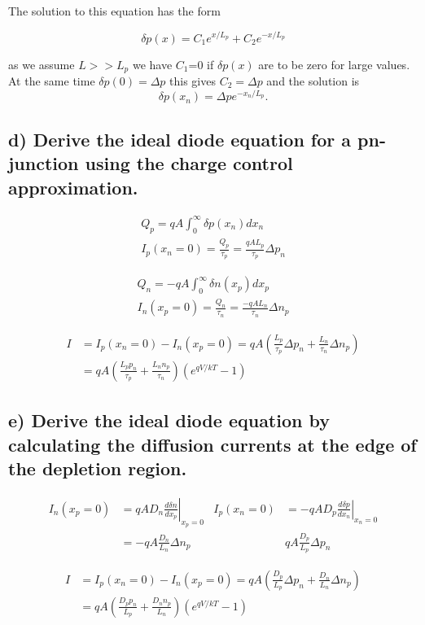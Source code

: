 The solution to this equation has the form

$$
\delta p(x)=C_1 e^{x / L_p}+C_2 e^{-x / L_p}
$$

as we assume $L>>L_p$ we have $C_1$=0 if $\delta p(x)$ are to be zero for large values. At the same time $\delta p(0)=\Delta p$ this gives $C_2=\Delta p$ and the solution is 
$$ \delta p\left(x_n\right)=\Delta p e^{-x_n / L_p} . $$

\subsection*{d) Derive the ideal diode equation for a pn-junction using the charge control approximation.}
$$
\begin{gathered}
Q_p=q A \int_0^{\infty} \delta p\left(x_n\right) d x_n \\
I_p\left(x_n=0\right)=\frac{Q_p}{\tau_p}=\frac{q A L_p}{\tau_p} \Delta p_n
\end{gathered}
$$

$$
\begin{gathered}
Q_n=-q A \int_0^{\infty} \delta n\left(x_p\right) d x_p \\
I_n\left(x_p=0\right)=\frac{Q_n}{\tau_n}=\frac{-q A L_n}{\tau_n} \Delta n_p
\end{gathered}
$$

$$
\begin{aligned}
I & =I_p\left(x_n=0\right)-I_n\left(x_p=0\right)=q A\left(\frac{L_p}{\tau_p} \Delta p_n+\frac{L_n}{\tau_n} \Delta n_p\right) \\
& =q A\left(\frac{L_p p_n}{\tau_p}+\frac{L_n n_p}{\tau_n}\right)\left(e^{q V / k T}-1\right)
\end{aligned}
$$

\subsection*{e) Derive the ideal diode equation by calculating the diffusion currents at the edge of the
depletion region.}

$$
\begin{aligned}
I_n\left(x_p=0\right) & =\left.q A D_n \frac{d \delta n}{d x_p}\right|_{x_p=0} & I_p\left(x_n=0\right) & =-\left.q A D_p \frac{d \delta p}{d x_n}\right|_{x_n=0} \\
& =-q A \frac{D_n}{L_n} \Delta n_p & & q A \frac{D_p}{L_p} \Delta p_n
\end{aligned}
$$

$$
\begin{aligned}
I & =I_p\left(x_n=0\right)-I_n\left(x_p=0\right)=q A\left(\frac{D_p}{L_p} \Delta p_n+\frac{D_n}{L_n} \Delta n_p\right) \\
& =q A\left(\frac{D_p p_n}{L_p}+\frac{D_n n_p}{L_n}\right)\left(e^{q V / k T}-1\right)
\end{aligned}
$$
